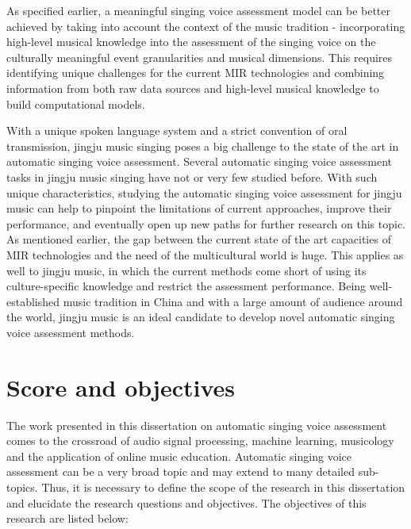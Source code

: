 As specified earlier, a meaningful singing voice assessment model can be better achieved by taking into account the context of the music tradition - incorporating high-level musical knowledge into the assessment of the singing voice on the culturally meaningful event granularities and musical dimensions. This requires identifying unique challenges for the current \gls{MIR} technologies and combining information from both raw data sources and high-level musical knowledge to build computational models.

With a unique spoken language system and a strict convention of oral transmission, jingju music singing poses a big challenge to the state of the art in automatic singing voice assessment. Several automatic singing voice assessment tasks in jingju music singing have not or very few studied before. With such unique characteristics, studying the automatic singing voice assessment for jingju music can help to pinpoint the limitations of current approaches, improve their performance, and eventually open up new paths for further research on this topic. As mentioned earlier, the gap between the current state of the art capacities of \gls{MIR} technologies and the need of the multicultural world is huge. This applies as well to jingju music, in which the current methods come short of using its culture-specific knowledge and restrict the assessment performance. Being well-established music tradition in China and with a large amount of audience around the world, jingju music is an ideal candidate to develop novel automatic singing voice assessment methods.

\section{Score and objectives}

The work presented in this dissertation on automatic singing voice assessment comes to the crossroad of audio signal processing, machine learning, musicology and the application of online music education. Automatic singing voice assessment can be a very broad topic and may extend to many detailed sub-topics. Thus, it is necessary to define the scope of the research in this dissertation and elucidate the research questions and objectives. The objectives of this research are listed below:

